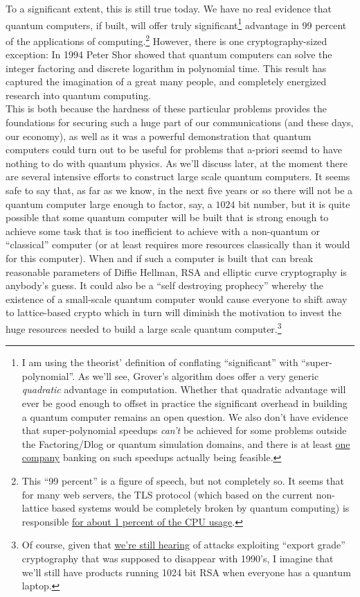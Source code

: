 To a significant extent, this is still true today. We have no real
evidence that quantum computers, if built, will offer truly
significant\footnote{I am using the theorist' definition of conflating
  ``significant'' with ``super-polynomial''. As we'll see, Grover's
  algorithm does offer a very generic \emph{quadratic} advantage in
  computation. Whether that quadratic advantage will ever be good enough
  to offset in practice the significant overhead in building a quantum
  computer remains an open question. We also don't have evidence that
  super-polynomial speedups \emph{can't} be achieved for some problems
  outside the Factoring/Dlog or quantum simulation domains, and there is
  at least \href{http://www.dwavesys.com/}{one company} banking on such
  speedups actually being feasible.} advantage in 99 percent of the
applications of computing.\footnote{This ``99 percent'' is a figure of
  speech, but not completely so. It seems that for many web servers, the
  TLS protocol (which based on the current non-lattice based systems
  would be completely broken by quantum computing) is responsible
  \href{https://goo.gl/Gekjrc}{for about 1 percent of the CPU usage}.}
However, there is one cryptography-sized exception: In 1994 Peter Shor
showed that quantum computers can solve the integer factoring and
discrete logarithm in polynomial time. This result has captured the
imagination of a great many people, and completely energized research
into quantum computing.\\
This is both because the hardness of these particular problems provides
the foundations for securing such a huge part of our communications (and
these days, our economy), as well as it was a powerful demonstration
that quantum computers could turn out to be useful for problems that
a-priori seemd to have nothing to do with quantum physics. As we'll
discuss later, at the moment there are several intensive efforts to
construct large scale quantum computers. It seems safe to say that, as
far as we know, in the next five years or so there will not be a quantum
computer large enough to factor, say, a \(1024\) bit number, but it is
quite possible that some quantum computer will be built that is strong
enough to achieve some task that is too inefficient to achieve with a
non-quantum or ``classical'' computer (or at least requires more
resources classically than it would for this computer). When and if such
a computer is built that can break reasonable parameters of Diffie
Hellman, RSA and elliptic curve cryptography is anybody's guess. It
could also be a ``self destroying prophecy'' whereby the existence of a
small-scale quantum computer would cause everyone to shift away to
lattice-based crypto which in turn will diminish the motivation to
invest the huge resources needed to build a large scale quantum
computer.\footnote{Of course, given that
  \href{http://blog.cryptographyengineering.com/2016/03/attack-of-week-drown.html}{we're
  still hearing} of attacks exploiting ``export grade'' cryptography
  that was supposed to disappear with 1990's, I imagine that we'll still
  have products running 1024 bit RSA when everyone has a quantum laptop.}

